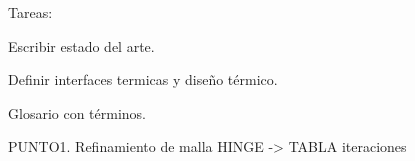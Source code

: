 
Tareas:

Escribir estado del arte.

Definir interfaces termicas y diseño térmico.

Glosario con términos.

PUNTO1. Refinamiento de malla HINGE -> TABLA iteraciones